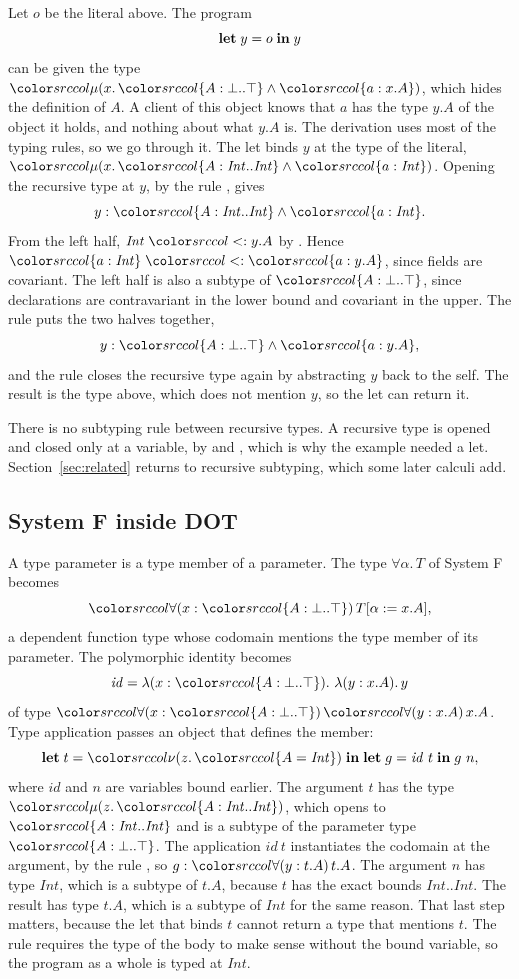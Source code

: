 \begin{example}\label{ex:hide}
Let $o$ be the literal above. The program
\[
\mathbf{let}\; y = o \;\mathbf{in}\; y
\]
can be given the type $\dmu{x}{\dtyp{A}{\bot}{\top} \wedge \dfld{a}{x.A}}$, which hides the definition of $A$. A client of this object knows that $a$ has the type $y.A$ of the object it holds, and nothing about what $y.A$ is. The derivation uses most of the typing rules, so we go through it. The let binds $y$ at the type of the literal, $\dmu{x}{\dtyp{A}{\mathit{Int}}{\mathit{Int}} \wedge \dfld{a}{\mathit{Int}}}$. Opening the recursive type at $y$, by the rule , gives
\[
y : \dtyp{A}{\mathit{Int}}{\mathit{Int}} \wedge \dfld{a}{\mathit{Int}} .
\]
From the left half, $\mathit{Int} \sub y.A$ by . Hence $\dfld{a}{\mathit{Int}} \sub \dfld{a}{y.A}$, since fields are covariant. The left half is also a subtype of $\dtyp{A}{\bot}{\top}$, since declarations are contravariant in the lower bound and covariant in the upper. The rule  puts the two halves together,
\[
y : \dtyp{A}{\bot}{\top} \wedge \dfld{a}{y.A} ,
\]
and the rule  closes the recursive type again by abstracting $y$ back to the self. The result is the type above, which does not mention $y$, so the let can return it.
\end{example}

There is no subtyping rule between recursive types. A recursive type is opened and closed only at a variable, by  and , which is why the example needed a let. Section~\ref{sec:related} returns to recursive subtyping, which some later calculi add.

\subsection{System F inside DOT}

A type parameter is a type member of a parameter. The type $\forall \alpha.\,T$ of System F becomes
\[
\dall{x}{\dtyp{A}{\bot}{\top}}{T[\alpha := x.A]} ,
\]
a dependent function type whose codomain mentions the type member of its parameter. The polymorphic identity becomes
\[
\mathit{id} = \lambda(x : \dtyp{A}{\bot}{\top}).\ \lambda(y : x.A).\,y
\]
of type $\dall{x}{\dtyp{A}{\bot}{\top}}{\dall{y}{x.A}{x.A}}$. Type application passes an object that defines the member:
\[
\klet t = \dnew{z}{\ddeftyp{A}{\mathit{Int}}} \kin \klet g = \mathit{id}\ t \kin g\ n ,
\]
where $\mathit{id}$ and $n$ are variables bound earlier. The argument $t$ has the type $\dmu{z}{\dtyp{A}{\mathit{Int}}{\mathit{Int}}}$, which opens to $\dtyp{A}{\mathit{Int}}{\mathit{Int}}$ and is a subtype of the parameter type $\dtyp{A}{\bot}{\top}$. The application $\mathit{id}\ t$ instantiates the codomain at the argument, by the rule , so $g : \dall{y}{t.A}{t.A}$. The argument $n$ has type $\mathit{Int}$, which is a subtype of $t.A$, because $t$ has the exact bounds $\mathit{Int}..\mathit{Int}$. The result has type $t.A$, which is a subtype of $\mathit{Int}$ for the same reason. That last step matters, because the let that binds $t$ cannot return a type that mentions $t$. The rule  requires the type of the body to make sense without the bound variable, so the program as a whole is typed at $\mathit{Int}$.

